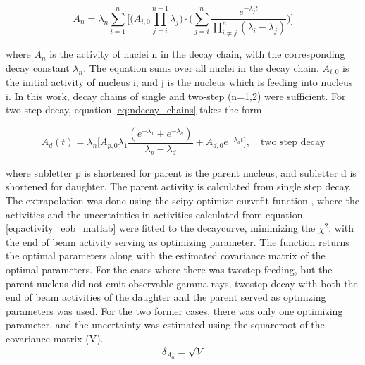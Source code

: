 \begin{equation} \label{eq:ndecay_chains}
    A_n = \lambda_n \sum_{i=1}^n \Big[ \Big( A_{i,0}\prod^{n-1}_{j=i}\lambda_j \Big)\cdot \Big( \sum_{j=i}^n \frac{e^{-\lambda_j t}}{\prod_{i\neq j}^n (\lambda_i - \lambda_j)} \Big) \Big]
\end{equation}

where $A_n$ is the activity of nuclei n in the decay chain, with the corresponding decay constant $\lambda_n$. The equation sums over all nuclei in the decay chain. $A_{i,0}$ is the initial activity of nucleus i, and j is the nucleus which is feeding into nucleus i. In this work, decay chains of single and two-step (n=1,2) were sufficient. For two-step decay, equation \ref{eq:ndecay_chains} takes the form

\begin{equation} \label{eq:twostep_activity}
    A_d(t) = \lambda_n \Big[ A_{p,0}\lambda_1 \frac{(e^{-\lambda_1 } + e^{-\lambda_d})}{\lambda_p - \lambda _d} + A_{d,0}e^{-\lambda_d t} \Big],\quad \text{two step decay}
\end{equation}

where subletter p is shortened for parent is the parent nucleus, and subletter d is shortened for daughter. The parent activity is calculated from single step decay. \\






\noindent The extrapolation was done using the scipy optimize curvefit function \cite{Virtanen2020}, where the activities and the uncertainties in activities calculated from equation \ref{eq:activity_eob_matlab} were fitted to the decaycurve, minimizing the $\chi^2$, with the end of beam activity serving as optimizing parameter. The function returns the optimal parameters along with the estimated covariance matrix of the optimal parameters. For the cases where there was twostep feeding, but the parent nucleus did not emit observable gamma-rays, twostep decay with both the end of beam activities of the daughter and the parent served as optmizing parameters was used. For the two former cases, there was only one optimizing parameter, and the uncertainty was estimated using the squareroot of the covariance matrix (V). 
\begin{equation}
    \delta_{A_0}=\sqrt{{V}}
\end{equation}


